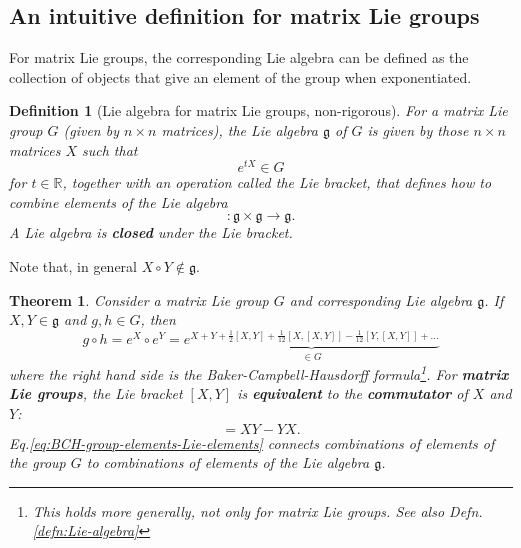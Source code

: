 \documentclass[11pt]{article}
\numberwithin{equation}{section}
\newtheorem{thm}{Theorem}[section]
\newtheorem{defn}{Definition}[section]
\begin{document}
\subsection{An intuitive definition for matrix Lie groups}
For matrix Lie groups, the corresponding Lie algebra can be defined as the collection of objects that give an element of the group when exponentiated. 
\begin{defn}[Lie algebra for matrix Lie groups, non-rigorous]
For a matrix Lie group $G$ (given by $n \times n$ matrices), the Lie algebra $\mathfrak{g}$ of $G$ is given by those $n \times n$ matrices $X$ such that
\begin{equation}
e^{tX}\in G \label{eq:def-generator-lie-matrix-group}
\end{equation}
for $t \in \mathbb{R}$, together with an operation called the Lie bracket, that defines how to combine elements of the Lie algebra
\begin{equation}
[\cdot, \cdot]: \mathfrak{g} \times \mathfrak{g} \rightarrow \mathfrak{g}.
\end{equation}
A Lie algebra is \textbf{closed} under the Lie bracket. 
\end{defn}
Note that, in general $X \circ Y \notin \mathfrak{g}$. 
\begin{thm}
Consider a matrix Lie group $G$ and corresponding Lie algebra $\mathfrak{g}$. If $X, Y \in \mathfrak{g}$ and $g, h \in G$, then
\begin{equation}
g \circ h = e^X \circ e^Y = \underbrace{e^{X + Y + \frac{1}{2}[X,Y]+\frac{1}{12}[X,[X,Y]]-\frac{1}{12}[Y,[X,Y]]+...}}_{\in G} \label{eq:BCH-group-elements-Lie-elements}
\end{equation}
where the right hand side is the Baker-Campbell-Hausdorff formula\footnote{This holds more generally, not only for matrix Lie groups. See also Defn. \ref{defn:Lie-algebra}}. For \textbf{matrix Lie groups}, the Lie bracket $[X,Y]$ is \textbf{equivalent} to the \textbf{commutator} of $X$ and $Y$:
\begin{equation}
[X,Y] = XY - YX.
\end{equation}
Eq.\eqref{eq:BCH-group-elements-Lie-elements} connects combinations of elements of the group $G$ to combinations of elements of the Lie algebra $\mathfrak{g}$.
\end{thm}
\end{document}
